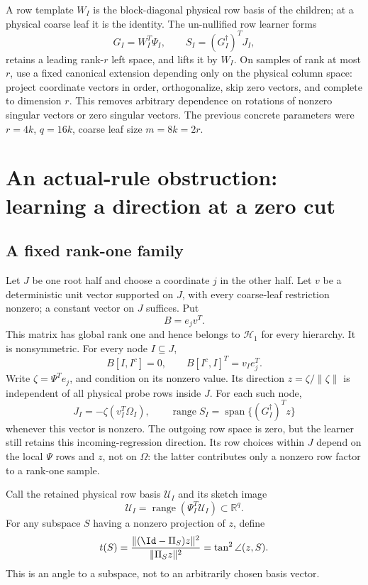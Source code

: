 \documentclass[11pt,oneside,openany,a4paper]{book}
\numberwithin{equation}{chapter}
\theoremstyle{definition}
\theoremstyle{remark}
\newcommand{\R}{\mathbb R}\newcommand{\E}{\mathbb E}\newcommand{\Prb}{\mathbb P}\newcommand{\PP}{\mathbb P}
\DeclareMathOperator{\ran}{range}\DeclareMathOperator{\OPT}{OPT}
\newcommand{\HH}{\mathcal H}\newcommand{\SSS}{\mathcal S}
\begin{document}
A row template $W_I$ is the block-diagonal physical row basis of the children; at a physical coarse leaf it is the identity. The un-nullified row learner forms
\begin{equation}\label{actual:eq:old}
 G_I=W_I^T\Psi_I,\qquad S_I=(G_I^\dagger)^T J_I,
\end{equation}
retains a leading rank-$r$ left space, and lifts it by $W_I$. On samples of rank at most $r$, use a fixed canonical extension depending only on the physical column space: project coordinate vectors in order, orthogonalize, skip zero vectors, and complete to dimension $r$. This removes arbitrary dependence on rotations of nonzero singular vectors or zero singular vectors. The previous concrete parameters were $r=4k$, $q=16k$, coarse leaf size $m=8k=2r$.

\section{An actual-rule obstruction: learning a direction at a zero cut}
\subsection{A fixed rank-one family}
Let $J$ be one root half and choose a coordinate $j$ in the other half. Let $v$ be a deterministic unit vector supported on $J$, with every coarse-leaf restriction nonzero; a constant vector on $J$ suffices. Put
\begin{equation}\label{actual:eq:oneway}
 B=e_jv^T.
\end{equation}
This matrix has global rank one and hence belongs to $\HH_1$ for every hierarchy. It is nonsymmetric. For every node $I\subseteq J$,
\[
 B[I,I^c]=0,\qquad B[I^c,I]^T=v_Ie_j^T.
\]
Write $\zeta=\Psi^Te_j$, and condition on its nonzero value. Its direction
$z=\zeta/\|\zeta\|$ is independent of all physical probe rows inside $J$. For each such node,
\begin{equation}\label{actual:eq:phantom}
 J_I=-\zeta(v_I^T\Omega_I),\qquad
 \ran S_I=\operatorname{span}\{(G_I^\dagger)^Tz\}
\end{equation}
whenever this vector is nonzero. The outgoing row space is zero, but the learner still retains this incoming-regression direction. Its row choices within $J$ depend on the local $\Psi$ rows and $z$, not on $\Omega$: the latter contributes only a nonzero row factor to a rank-one sample.

Call the retained physical row basis $\mathcal U_I$ and its sketch image
\[
 \mathscr U_I=\ran(\Psi_I^T\mathcal U_I)\subset\R^q.
\]
For any subspace $S$ having a nonzero projection of $z$, define
\begin{equation}\label{actual:eq:tangent}
 t(S)=\frac{\|(\Id-\Pi_S)z\|^2}{\|\Pi_Sz\|^2}
     =\tan^2\angle(z,S).
\end{equation}
This is an angle to a subspace, not to an arbitrarily chosen basis vector.
\end{document}
